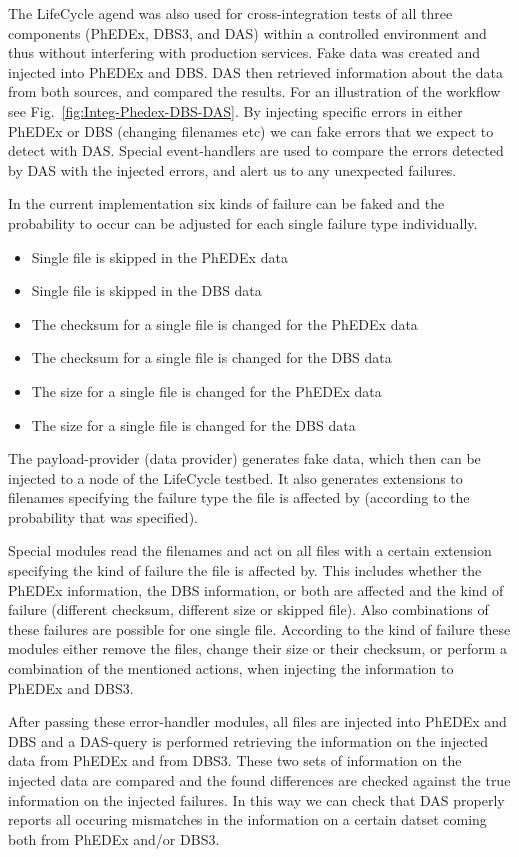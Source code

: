 The LifeCycle agend was also used for cross-integration tests of all three
components (PhEDEx, DBS3, and DAS) within a controlled environment and thus
without interfering with production services. Fake data was created and injected into PhEDEx and DBS. DAS then
retrieved information about the data from both sources, and compared the
results. For an illustration of the workflow see Fig.~\ref{fig:Integ-Phedex-DBS-DAS}. By injecting specific errors in either PhEDEx or DBS (changing filenames etc)
we can fake errors that we expect to detect with DAS. Special event-handlers
are used to compare the errors detected by DAS with the injected errors, and
alert us to any unexpected failures.

In the current implementation six kinds of failure can be faked and the probability to occur
can be adjusted for each single failure type individually.

\begin{itemize}
\item Single file is skipped in the PhEDEx data
\item Single file is skipped in the DBS data
\item The checksum for a single file is changed for the PhEDEx data
\item The checksum for a single file is changed for the DBS data
\item The size for a single file is changed for the PhEDEx data
\item The size for a single file is changed for the DBS data
\end{itemize}

The payload-provider (data provider) generates fake data, which then can be
injected to a node of the LifeCycle testbed. It also
generates extensions to filenames specifying the failure type the file is
affected by (according to the probability that was specified).

Special modules read the filenames and act on all files with a certain
extension specifying the kind of failure the file is affected by. This
includes whether the PhEDEx information, the DBS information,
or both are affected and the kind of failure (different checksum, different
size or skipped file). Also combinations of these failures are possible for
one single file. According to the kind of failure these modules either
remove the files, change their size or their checksum, or perform a
combination of the mentioned actions, when injecting the
information to PhEDEx and DBS3.

After passing these error-handler modules, all files are injected into PhEDEx
and DBS and a DAS-query is performed retrieving the information on the
injected data from PhEDEx and from DBS3.
These two sets of information on the injected data are compared and the found
differences are checked against the true information on the injected failures.
In this way we can check that DAS properly reports all occuring mismatches in
the information on a certain datset coming both from PhEDEx and/or DBS3.


